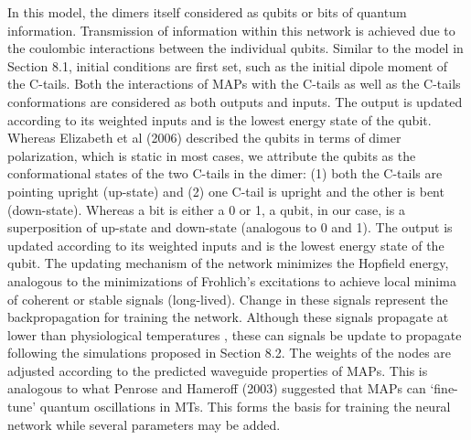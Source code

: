\documentclass[letterpaper,final,times]{cas-dc}
\numberwithin{equation}{section}
\begin{document}
In this model, the dimers itself considered as qubits or bits of quantum information. Transmission of information within this network is achieved due to the coulombic interactions between the individual qubits. Similar to the model in Section 8.1, initial conditions are first set, such as the initial dipole moment of the C-tails. Both the interactions of MAPs with the C-tails as well as the C-tails conformations are considered as both outputs and inputs. The output is updated
according to its weighted inputs and is the lowest energy state of the qubit. Whereas Elizabeth et al (2006) described the qubits in terms of dimer polarization, which is static in most cases, we attribute the qubits as the conformational states of the two C-tails in the dimer: (1) both the C-tails are pointing upright (up-state) and (2) one C-tail is upright and the
other is bent (down-state). Whereas a bit is either a 0 or 1, a qubit, in our case, is a superposition of up-state and down-state (analogous to 0 and 1). The output is updated according to its weighted inputs and is the lowest energy state of the qubit. The updating mechanism of the network minimizes the Hopfield energy, analogous to the minimizations of Frohlich’s excitations to achieve local minima of coherent or stable signals (long-lived). Change in these signals represent the backpropagation for training the network. Although these signals propagate at lower than physiological temperatures \citep{95}, these can signals be update to propagate following the simulations proposed in Section 8.2. The weights of the nodes are adjusted according to the predicted waveguide properties of MAPs. This is analogous to what Penrose and Hameroff (2003) suggested that MAPs can ‘fine-tune’ quantum oscillations in MTs. This forms the basis for training the neural network while several parameters may be added.




%



\end{document}
